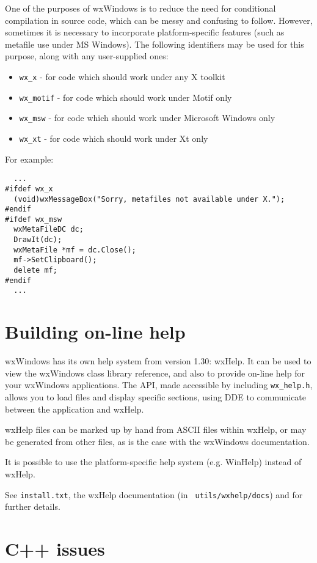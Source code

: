 One of the purposes of wxWindows is to reduce the need for conditional
compilation in source code, which can be messy and confusing to follow.
However, sometimes it is necessary to incorporate platform-specific
features (such as metafile use under MS Windows). The following identifiers
may be used for this purpose, along with any user-supplied ones:

\begin{itemize}
\item {\tt wx\_x} - for code which should work under any X toolkit
\item {\tt wx\_motif} - for code which should work under Motif only
\item {\tt wx\_msw} - for code which should work under Microsoft Windows only
\item {\tt wx\_xt} - for code which should work under Xt only
\end{itemize}

For example:

\begin{verbatim}
  ...
#ifdef wx_x
  (void)wxMessageBox("Sorry, metafiles not available under X.");
#endif
#ifdef wx_msw
  wxMetaFileDC dc;
  DrawIt(dc);
  wxMetaFile *mf = dc.Close();
  mf->SetClipboard();
  delete mf;
#endif
  ...
\end{verbatim}

\section{Building on-line help}

wxWindows has its own help system from version 1.30: wxHelp. It can be
used to view the wxWindows class library reference, and also to provide
on-line help for your wxWindows applications. The API, made accessible
by including {\tt wx\_help.h}, allows you to load files and display
specific sections, using DDE to communicate between the application and
wxHelp.

wxHelp files can be marked up by hand from ASCII files within wxHelp,
or may be generated from other files, as is the case with the wxWindows
documentation.

It is possible to use the platform-specific help
system (e.g. WinHelp) instead of wxHelp.

See {\tt install.txt}, the wxHelp documentation (in {\tt
utils/wxhelp/docs}) and  for further details.

\section{C++ issues}

